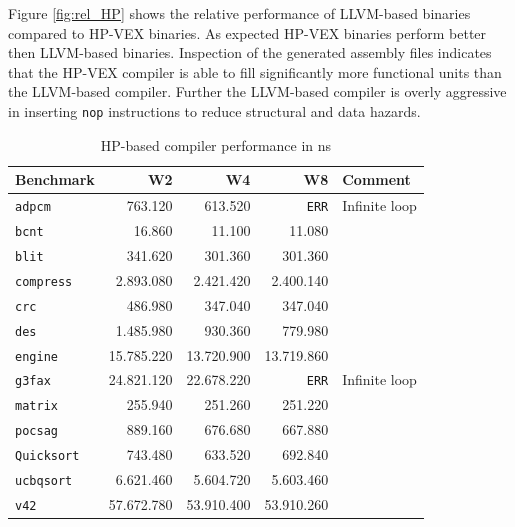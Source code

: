 Figure \ref{fig:rel_HP} shows the relative performance of LLVM-based binaries compared to HP-VEX binaries. As expected HP-VEX binaries perform better then LLVM-based binaries. Inspection of the generated assembly files indicates that the HP-VEX compiler is able to fill significantly more functional units than the LLVM-based compiler. Further the LLVM-based compiler is overly aggressive in inserting \texttt{nop} instructions to reduce structural and data hazards.

\begin{table}
  \centering
    \begin{tabular}{|l|r|r|r|l|}
    \hline
    \textbf{Benchmark} & \multicolumn{1}{|r|}{\textbf{W2}} & \multicolumn{1}{|r|}{\textbf{W4}}  & \multicolumn{1}{|r|}{\textbf{W8}} & \textbf{Comment} \\ \hline
	\texttt{adpcm} 		&   763.120 	&   613.520 	&   \texttt{ERR} 	& Infinite loop	\\ \hline
	\texttt{bcnt} 		&   16.860 		&   11.100 		&   11.080 			& 	\\ \hline
	\texttt{blit} 		&   341.620 	&   301.360 	&   301.360 		& 	\\ \hline
	\texttt{compress} 	&   2.893.080 	&   2.421.420 	&   2.400.140 		& 	\\ \hline
	\texttt{crc} 		&   486.980 	&   347.040 	&   347.040 		& 	\\ \hline
	\texttt{des} 		&   1.485.980 	&   930.360 	&   779.980 		& 	\\ \hline
	\texttt{engine} 	&   15.785.220 	&   13.720.900 	&   13.719.860 		& 	\\ \hline
	\texttt{g3fax} 		&   24.821.120 	&   22.678.220 	&   \texttt{ERR} 	& Infinite loop	\\ \hline
	\texttt{matrix} 	&   255.940 	&   251.260 	&   251.220 		& 	\\ \hline
	\texttt{pocsag} 	&   889.160 	&   676.680 	&   667.880 		& 	\\ \hline
	\texttt{Quicksort} 	&   743.480		&   633.520 	&   692.840 		& 	\\ \hline
	\texttt{ucbqsort} 	&   6.621.460 	&   5.604.720 	&   5.603.460 		& 	\\ \hline
	\texttt{v42}	 	&   57.672.780 	&   53.910.400	&   53.910.260 		& 	\\ \hline
    \end{tabular}
  \caption{HP-based compiler performance in ns}
  \label{tbl:HP_perf}
\end{table}

